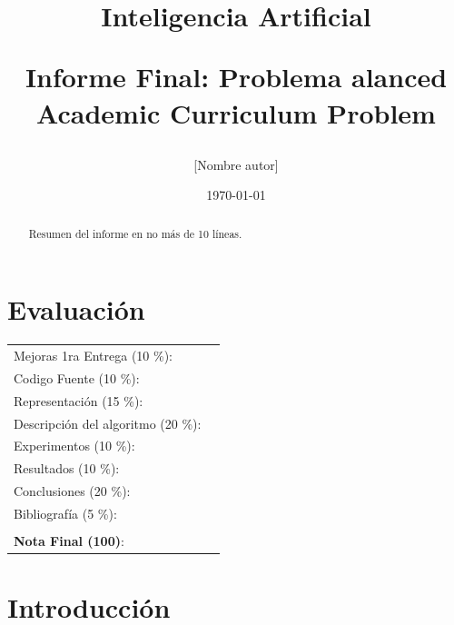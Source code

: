 \documentclass[letter, 10pt]{article}
\begin{document}
\title{Inteligencia Artificial \\ \begin{Large}Informe Final: Problema alanced Academic Curriculum Problem\end{Large}}
\author{[Nombre autor]}
\date{\today}
\maketitle


\section*{Evaluación}

\begin{tabular}{ll}
Mejoras 1ra Entrega (10 \%): &  \underline{\hspace{2cm}}\\
Codigo Fuente (10 \%): &  \underline{\hspace{2cm}}\\
Representación (15 \%):  & \underline{\hspace{2cm}} \\
Descripción del algoritmo (20 \%):  & \underline{\hspace{2cm}} \\
Experimentos (10 \%):  & \underline{\hspace{2cm}} \\
Resultados (10 \%):  & \underline{\hspace{2cm}} \\
Conclusiones (20 \%): &  \underline{\hspace{2cm}}\\
Bibliografía (5 \%): & \underline{\hspace{2cm}}\\
 &  \\
\textbf{Nota Final (100)}:   & \underline{\hspace{2cm}}
\end{tabular}

\begin{abstract}
Resumen del informe en no m\'as de 10 l\'ineas.
\end{abstract}

\section{Introducción}
\end{document}

